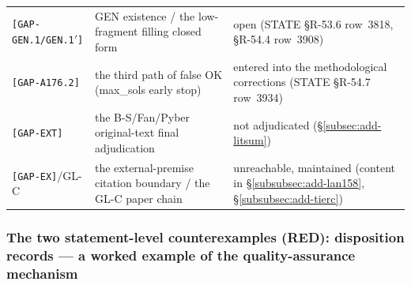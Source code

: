 \begin{longtable}{p{}p{}p{}}
\texttt{[GAP-GEN.1/GEN.1$'$]} & GEN existence / the low-fragment filling
closed form & open (STATE \S R-53.6 row~3818, \S R-54.4 row~3908) \\
\texttt{[GAP-A176.2]} & the third path of false OK (max\_sols early stop) &
entered into the methodological corrections (STATE \S R-54.7 row~3934) \\
\texttt{[GAP-EXT]} & the B-S/Fan/Pyber original-text final adjudication &
not adjudicated (\S\ref{subsec:add-litsum}) \\
\texttt{[GAP-EX]}/GL-C & the external-premise citation boundary / the GL-C
paper chain & unreachable, maintained (content in
\S\ref{subsubsec:add-lan158}, \S\ref{subsubsec:add-tierc}) \\
\end{longtable}

\subsubsection{The two statement-level counterexamples (RED): disposition
records --- a worked example of the quality-assurance mechanism
\tierProf}\label{subsubsec:add-red}


